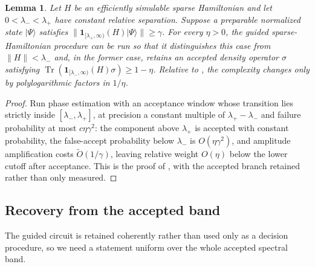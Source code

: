 \documentclass[11pt]{article}
\newtheorem{lemma}[lemma]{Lemma}
\theoremstyle{definition}
\theoremstyle{remark}
\newcommand{\1}{\mathbf 1}
\DeclareMathOperator{\Tr}{Tr}
\numberwithin{equation}{section}
\begin{document}
\begin{lemma}\label{lem:quantum-band-filter}
Let $H$ be an efficiently simulable sparse Hamiltonian and let
$0<\lambda_-<\lambda_+$ have constant relative separation.  Suppose a
preparable normalized state $|\Psi\rangle$ satisfies
$\|\1_{[\lambda_+,\infty)}(H)|\Psi\rangle\|\ge\gamma$.  For every
$\eta>0$, the guided sparse-Hamiltonian procedure can be run so that it
distinguishes this case from $\|H\|<\lambda_-$ and, in the former case,
retains an accepted density operator $\sigma$ satisfying
$\Tr(\1_{[\lambda_-,\infty)}(H)\sigma)\ge1-\eta$.  Relative to
\cite[Theorem~63]{SOKB}, the complexity changes only by polylogarithmic
factors in $1/\eta$.
\end{lemma}
\begin{proof}
Run phase estimation with an acceptance window whose transition lies
strictly inside $[\lambda_-,\lambda_+]$, at precision a constant
multiple of $\lambda_+-\lambda_-$ and failure probability at most
$c\eta\gamma^2$: the component above $\lambda_+$ is accepted with
constant probability, the false-accept probability below $\lambda_-$ is
$O(\eta\gamma^2)$, and amplitude amplification costs
$\widetilde O(1/\gamma)$, leaving relative weight $O(\eta)$ below the
lower cutoff after acceptance.  This is the proof of
\cite[Theorem~63]{SOKB}, with the accepted branch retained rather than
only measured.
\end{proof}

\subsection{Recovery from the accepted band}\label{sec:quantum-recovery}

The guided circuit is retained coherently rather than used only as a
decision procedure, so we need a statement uniform over the whole
accepted spectral band.
\end{document}
